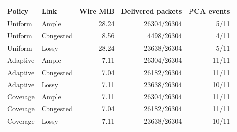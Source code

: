 \begin{tabular}{llrrr}
\toprule
Policy & Link & Wire MiB & Delivered packets & PCA events \\
\midrule
Uniform & Ample & 28.24 & 26304/26304 & 5/11 \\
Uniform & Congested & 8.56 & 4498/26304 & 4/11 \\
Uniform & Lossy & 28.24 & 23638/26304 & 5/11 \\
Adaptive & Ample & 7.11 & 26304/26304 & 11/11 \\
Adaptive & Congested & 7.04 & 26182/26304 & 11/11 \\
Adaptive & Lossy & 7.11 & 23638/26304 & 10/11 \\
Coverage & Ample & 7.11 & 26304/26304 & 11/11 \\
Coverage & Congested & 7.04 & 26182/26304 & 11/11 \\
Coverage & Lossy & 7.11 & 23638/26304 & 10/11 \\
\bottomrule
\end{tabular}
